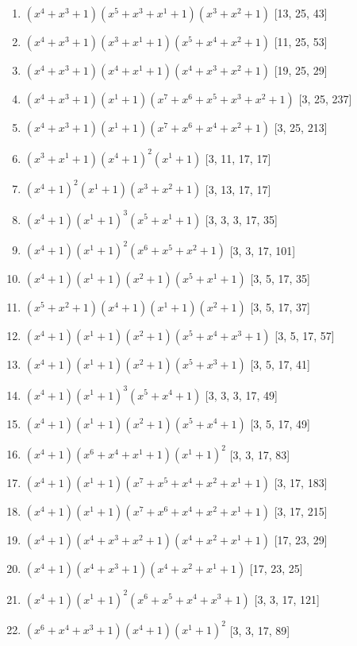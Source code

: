 \documentclass[10pt,twocolumn]{article}
\begin{document}
\begin{enumerate}
\item $(x^{4} + x^{3} + 1)(x^{5} + x^{3} + x^{1} + 1)(x^{3} + x^{2} + 1)$  [13, 25, 43]
\item $(x^{4} + x^{3} + 1)(x^{3} + x^{1} + 1)(x^{5} + x^{4} + x^{2} + 1)$  [11, 25, 53]
\item $(x^{4} + x^{3} + 1)(x^{4} + x^{1} + 1)(x^{4} + x^{3} + x^{2} + 1)$  [19, 25, 29]
\item $(x^{4} + x^{3} + 1)(x^{1} + 1)(x^{7} + x^{6} + x^{5} + x^{3} + x^{2} + 1)$  [3, 25, 237]
\item $(x^{4} + x^{3} + 1)(x^{1} + 1)(x^{7} + x^{6} + x^{4} + x^{2} + 1)$  [3, 25, 213]
\item $(x^{3} + x^{1} + 1)(x^{4} + 1)^{2}(x^{1} + 1)$  [3, 11, 17, 17]
\item $(x^{4} + 1)^{2}(x^{1} + 1)(x^{3} + x^{2} + 1)$  [3, 13, 17, 17]
\item $(x^{4} + 1)(x^{1} + 1)^{3}(x^{5} + x^{1} + 1)$  [3, 3, 3, 17, 35]
\item $(x^{4} + 1)(x^{1} + 1)^{2}(x^{6} + x^{5} + x^{2} + 1)$  [3, 3, 17, 101]
\item $(x^{4} + 1)(x^{1} + 1)(x^{2} + 1)(x^{5} + x^{1} + 1)$  [3, 5, 17, 35]
\item $(x^{5} + x^{2} + 1)(x^{4} + 1)(x^{1} + 1)(x^{2} + 1)$  [3, 5, 17, 37]
\item $(x^{4} + 1)(x^{1} + 1)(x^{2} + 1)(x^{5} + x^{4} + x^{3} + 1)$  [3, 5, 17, 57]
\item $(x^{4} + 1)(x^{1} + 1)(x^{2} + 1)(x^{5} + x^{3} + 1)$  [3, 5, 17, 41]
\item $(x^{4} + 1)(x^{1} + 1)^{3}(x^{5} + x^{4} + 1)$  [3, 3, 3, 17, 49]
\item $(x^{4} + 1)(x^{1} + 1)(x^{2} + 1)(x^{5} + x^{4} + 1)$  [3, 5, 17, 49]
\item $(x^{4} + 1)(x^{6} + x^{4} + x^{1} + 1)(x^{1} + 1)^{2}$  [3, 3, 17, 83]
\item $(x^{4} + 1)(x^{1} + 1)(x^{7} + x^{5} + x^{4} + x^{2} + x^{1} + 1)$  [3, 17, 183]
\item $(x^{4} + 1)(x^{1} + 1)(x^{7} + x^{6} + x^{4} + x^{2} + x^{1} + 1)$  [3, 17, 215]
\item $(x^{4} + 1)(x^{4} + x^{3} + x^{2} + 1)(x^{4} + x^{2} + x^{1} + 1)$  [17, 23, 29]
\item $(x^{4} + 1)(x^{4} + x^{3} + 1)(x^{4} + x^{2} + x^{1} + 1)$  [17, 23, 25]
\item $(x^{4} + 1)(x^{1} + 1)^{2}(x^{6} + x^{5} + x^{4} + x^{3} + 1)$  [3, 3, 17, 121]
\item $(x^{6} + x^{4} + x^{3} + 1)(x^{4} + 1)(x^{1} + 1)^{2}$  [3, 3, 17, 89]

\end{enumerate}
\end{document}

